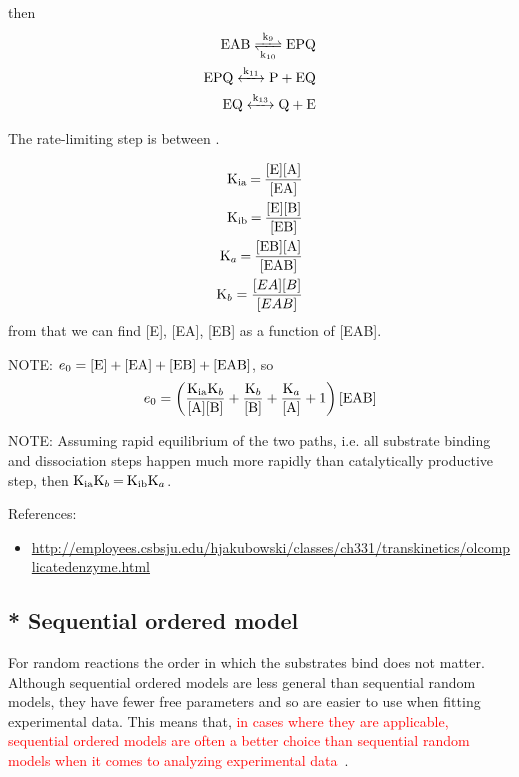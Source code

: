 then
\begin{equation}
\begin{split}
\ce{EAB <=>[k_9][k_{10}] EPQ} \\
\ce{EPQ <->[k_{11}] P + EQ} \\
\ce{EQ <->[k_{13}] Q + E}
\end{split}
\end{equation}

The rate-limiting step is between .

\begin{equation}
\begin{split}
\ce{K_{ia} = \frac{[E][A]}{[EA]}} \\
\ce{K_{ib} = \frac{[E][B]}{[EB]}} \\
\ce{K_{a} = \frac{[EB][A]}{[EAB]}} \\
\ce{K_{b}} = \frac{[EA][B]}{[EAB]} 
\end{split}
\end{equation}
from that we can find [E], [EA], [EB] as a function of [EAB].

NOTE: $e_0 = \ce{[E] + [EA] + [EB] + [EAB]}$, so
\begin{equation}
e_0 =  \left( \ce{\frac{K_{ia}K_b}{[A][B]} + \frac{K_b}{[B]} + \frac{K_a}{[A]}
+1} \right) \ce{[EAB]}
\end{equation}

NOTE: Assuming rapid equilibrium of the two paths, i.e. all substrate binding
and dissociation steps happen much more rapidly than catalytically productive
step, then $\ce{K_{ia}K_b = K_{ib}K_a}$.


References:
\begin{itemize}
  \item
  \url{http://employees.csbsju.edu/hjakubowski/classes/ch331/transkinetics/olcomplicatedenzyme.html}
\end{itemize}

\subsection{* Sequential ordered model}
\label{sec:sequential-ordered-models}

For random reactions the order in which the substrates bind does not matter. 
Although sequential ordered models are less general than sequential random
models, they have fewer free parameters and so are easier to use when fitting
experimental data. This means that, \textcolor{red}{in cases where they are
applicable, sequential ordered models
  are often a better choice than sequential random models when it comes to
  analyzing experimental data}~\citep{monod1965nat}.

